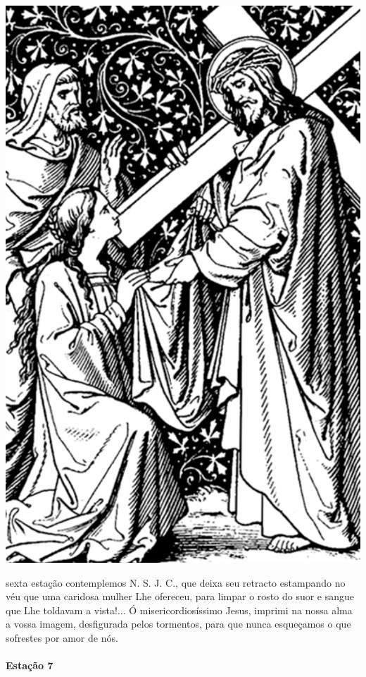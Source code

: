 \begin{nscenter}
\includegraphics[width=.8\textwidth, height=.8\textheight, keepaspectratio]{media/station6}
\end{nscenter}

 sexta estação contemplemos N. S. J. C., que deixa seu retracto estampando no véu que uma caridosa mulher Lhe ofereceu, para limpar o rosto do suor e sangue que Lhe toldavam a vista!...
Ó misericordiosíssimo Jesus, imprimi na nossa alma a vossa imagem, desfigurada pelos tormentos, para que nunca esqueçamos o que sofrestes por amor de nós.

\newpage

\paragraph{Estação 7}

